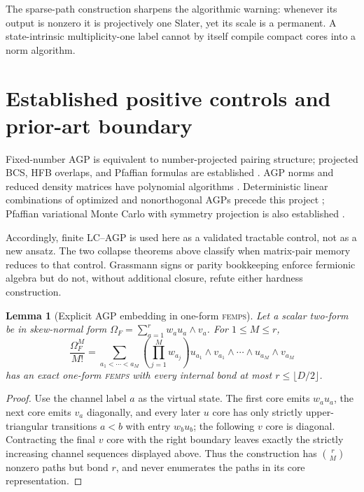 \documentclass[11pt]{article}
\newtheorem{lemma}[theorem]{Lemma}
\theoremstyle{definition}
\newcommand{\FEMPS}{\textnormal{\textsc{femps}}}
\begin{document}
The sparse-path construction sharpens the algorithmic warning: whenever its output is nonzero it is
projectively one Slater, yet its scale is a permanent.  A state-intrinsic
multiplicity-one label cannot by itself compile compact cores into a norm
algorithm.

\section{Established positive controls and prior-art boundary}

Fixed-number AGP is equivalent to number-projected pairing structure; projected
BCS, HFB overlaps, and Pfaffian formulas are established
\cite{DukelskyPittelEsebbag2016PBCS,Robledo2009HFBOverlap,
BertschRobledo2012SymmetryRestoration}.  AGP norms and
reduced density matrices have polynomial algorithms
\cite{KhamoshiHendersonScuseria2019AGPRDM}.  Deterministic linear combinations
of optimized and nonorthogonal AGPs precede this project
\cite{UemuraKasamatsuSugino2015AGPCI,
DuttaChenHendersonScuseria2021NonorthogonalAGP}; Pfaffian variational Monte
Carlo with symmetry projection is also established
\cite{TaharaImada2008mVMC,BajdichMitasWagnerSchmidt2008PfaffianQMC}.

Accordingly, finite LC--AGP is used here as a validated tractable control, not
as a new ansatz.  The two collapse theorems above classify when matrix-pair
memory reduces to that control.  Grassmann signs or parity bookkeeping enforce
fermionic algebra but do not, without additional closure, refute either
hardness construction.

\begin{lemma}[Explicit AGP embedding in one-form \FEMPS{}]
Let a scalar two-form be in skew-normal form
$\Omega_F=\sum_{a=1}^r w_a u_a\wedge v_a$.  For $1\le M\le r$,
\[
 \frac{\Omega_F^M}{M!}
 =\sum_{a_1<\cdots<a_M}\left(\prod_{j=1}^M w_{a_j}\right)
 u_{a_1}\wedge v_{a_1}\wedge\cdots\wedge
 u_{a_M}\wedge v_{a_M}
\]
has an exact one-form \FEMPS{} with every internal bond at most
$r\le\lfloor D/2\rfloor$.
\end{lemma}

\begin{proof}
Use the channel label $a$ as the virtual state.  The first core emits
$w_a u_a$, the next core emits $v_a$ diagonally, and every later $u$ core has
only strictly upper-triangular transitions $a<b$ with entry $w_bu_b$; the
following $v$ core is diagonal.  Contracting the final $v$ core with the right
boundary leaves exactly the strictly increasing channel sequences displayed
above.  Thus the construction has $\binom rM$ nonzero paths but bond $r$, and
never enumerates the paths in its core representation.
\end{proof}
\end{document}
